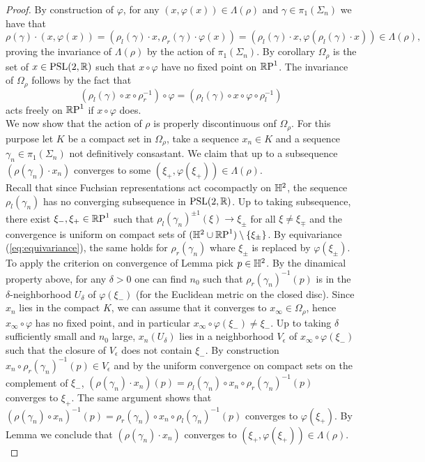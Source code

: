 \begin{proof}
    By construction of $\varphi$, for any $(x, \varphi(x)) \in \Lambda(\rho)$ and $\gamma \in \pi_1(\Sigma_n)$ we have that 
    \[
        \rho(\gamma) \cdot(x,\varphi(x)) = (\rho_l(\gamma) \cdot x, \rho_r(\gamma) \cdot \varphi(x)) = (\rho_l(\gamma) \cdot x,  \varphi(\rho_l(\gamma)\cdot x)) \in \Lambda(\rho), 
    \]
    proving the invariance of $\Lambda(\rho)$ by the action of $\pi_1(\Sigma_n)$. By corollary  $\Omega_\rho$ is the set of $x \in \PSL$ such that $x\circ \varphi$ have no fixed point on $\S$. The invariance of $\Omega_\rho$ follows by the fact that
    \[
        (\rho_l(\gamma) \circ x \circ \rho_r^{-1} ) \circ \varphi = (\rho_l(\gamma) \circ x \circ \varphi \circ \rho_l^{-1})
    \]
    acts freely on $\S$ if $x \circ \varphi$  does.\\
    We now show that the action of $\rho$ is properly discontinuous onf $\Omega_\rho$. For this purpose let $K$ be a compact set in $\Omega_\rho$, take a sequence $x_n \in K$ and a sequence $\gamma_n \in \pi_1(\Sigma_n)$ not definitively consastant. We claim that up to a subsequence $(\rho(\gamma_n)\cdot x_n)$ converges to some $(\xi_+, \varphi(\xi_+)) \in \Lambda(\rho)$.\\
    Recall that since Fuchsian representations act cocompactly on $\H^2$, the sequence $\rho_l(\gamma_n)$ has no converging subsequence in $\PSL$. Up to taking subsequence, there exist $\xi_-,\xi_+ \in \S$ such that $\rho_l(\gamma_n)^{\pm 1}(\xi) \to \xi_\pm$ for all $\xi \neq \xi_\mp$ and the convergence is uniform on compact sets of $(\H^2 \cup \S) \setminus \{\xi_\pm \}$. By equivariance (\ref{eq:equivariance}), the same holds for $\rho_r(\gamma_n)$ whare $\xi_\pm$ is replaced by $\varphi (\xi_\pm)$.\\
    To apply the criterion on convergence of Lemma  pick $p\in \H^2$. By the dinamical property above, for any $\delta >0$ one can find $n_0$ such that $\rho_r(\gamma_n)^{-1}(p)$ is in the $\delta$-neighborhood $U_\delta$ of $\varphi(\xi_-)$ (for the Euclidean metric on the closed disc).
    Since $x_n$ lies in the compact $K$, we can assume that it converges to $x_\infty \in \Omega_\rho$, hence $x_\infty \circ \varphi$ has no fixed point, and in particular $x_\infty \circ \varphi(\xi_-) \neq \xi_-$.
    Up to taking $\delta$ sufficiently small and $n_0$ large, $x_n(U_\delta)$ lies in a neighborhood $V_\epsilon$ of $x_\infty \circ \varphi(\xi_-)$ such that the closure of $V_\epsilon$ does not contain $\xi_-$.
    By construction $x_n \circ \rho_r(\gamma_n)^{-1}(p) \in V_\epsilon$ and by the uniform convergence on compact sets on the complement of $\xi_-$, $(\rho(\gamma_n) \cdot x_n) (p) = \rho_l(\gamma_n)\circ x_n \circ \rho_r(\gamma_n)^{-1}(p)$ converges to $\xi_+$. The same argument shows that $(\rho(\gamma_n) \circ x_n)^{-1}(p) = \rho_r(\gamma_n)\circ x_n \circ \rho_l(\gamma_n)^{-1}(p)$ converges to $\varphi(\xi_+)$. By Lemma  we conclude that $(\rho(\gamma_n)\cdot x_n)$ converges to $(\xi_+, \varphi(\xi_+)) \in \Lambda(\rho)$.\\

\end{proof}
